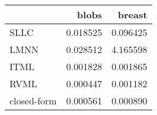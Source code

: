\begin{tabular}{lrr}
\toprule
{} &     blobs &    breast \\
\midrule
SLLC        &  0.018525 &  0.096425 \\
LMNN        &  0.028512 &  4.165598 \\
ITML        &  0.001828 &  0.001865 \\
RVML        &  0.000447 &  0.001182 \\
closed-form &  0.000561 &  0.000890 \\
\bottomrule
\end{tabular}

